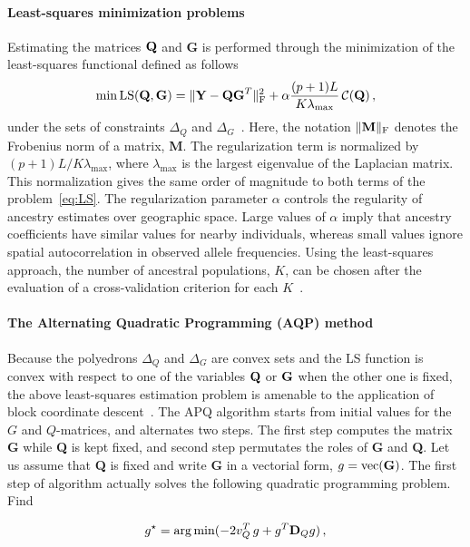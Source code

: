 \paragraph{Least-squares minimization problems} Estimating the matrices ${\bf Q}$ and {\bf G } is performed through the minimization of the least-squares functional defined as follows
\begin{equation}
\min {\rm LS}({\bf Q}, {\bf G}) =   \|  {\bf Y} - {\bf QG}^T \|^2_{\rm F} +  \alpha \frac{(p+1)L}{K \lambda_{\max}} \, {\cal C}({\bf Q}) \, , 
\label{eq:LS}
\end{equation}
 \noindent under the sets of constraints $\Delta_Q$ and  $\Delta_G$~\cite{Caye2016}. Here, the notation $\|  {\bf M}  \|_{\rm F}$ denotes the Frobenius norm of a matrix, {\bf M}. The regularization term is normalized by $(p+1)L/K \lambda_{\max}$, where $\lambda_{\max}$ is the largest eigenvalue of the Laplacian matrix. This normalization gives the same order of magnitude to both terms of the problem~\ref{eq:LS}. The regularization parameter $\alpha$ controls the regularity of ancestry estimates over geographic space.  Large values of $\alpha$ imply that ancestry coefficients have similar values for nearby individuals, whereas small values ignore spatial autocorrelation in observed allele frequencies. Using the least-squares approach, the number of ancestral populations, $K$, can be chosen after the evaluation of a cross-validation criterion for each $K$~\citep{Alexander2011, Frichot2014, Frichot2015}.


\paragraph{The Alternating Quadratic Programming (AQP) method} Because the poly\-edrons $\Delta_Q$ and  $\Delta_G$ are convex sets and the LS function is convex with
respect to one of the variables ${\bf Q}$ or ${\bf G}$ when the other one is fixed, the above least-squares estimation problem is amenable to the application of block coordinate descent~\citep{Bertsekas1995}. The APQ algorithm starts from initial values for the $G$ and $Q$-matrices, and alternates two steps. The first step computes the matrix {\bf G} while  {\bf Q} is kept fixed, and second step permutates the roles of {\bf G} and {\bf Q}.  Let us assume that {\bf Q} is fixed and write {\bf G} in a vectorial form, $g = {\rm vec({\bf G})}$. The first step of algorithm actually solves the following quadratic programming problem. Find  

$$
g^\star = \arg \min  ( -2  v^T_Q \, g + g^T {\bf D}_Q g ) \, ,  
$$


